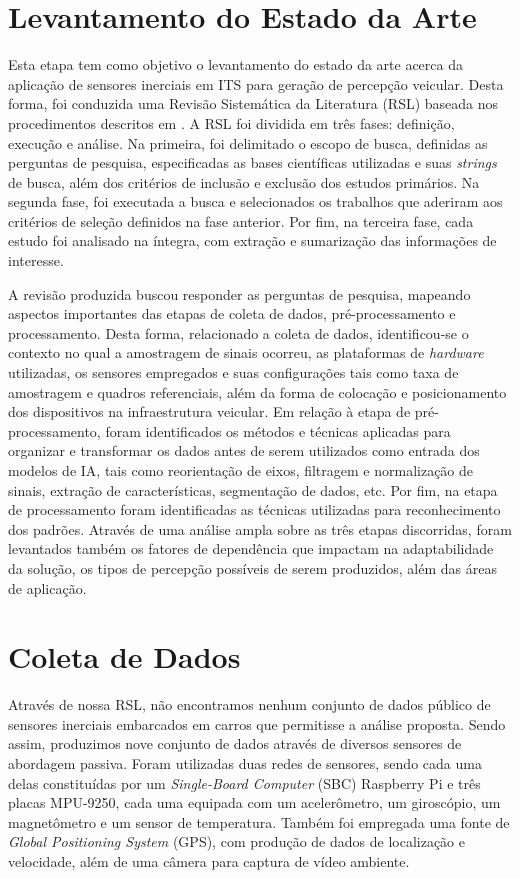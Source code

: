 \section{Levantamento do Estado da Arte}

Esta etapa tem como objetivo o levantamento do estado da arte acerca da aplicação de sensores inerciais em ITS para geração de percepção veicular. Desta forma, foi conduzida uma Revisão Sistemática da Literatura (RSL) baseada nos procedimentos descritos em \cite{kitchenham2004,kitchenham2009,biolchini2005}. A RSL foi dividida em três fases: definição, execução e análise. Na primeira, foi delimitado o escopo de busca, definidas as perguntas de pesquisa, especificadas as bases científicas utilizadas e suas \textit{strings} de busca, além dos critérios de inclusão e exclusão dos estudos primários. Na segunda fase, foi executada a busca e selecionados os trabalhos que aderiram aos critérios de seleção definidos na fase anterior. Por fim, na terceira fase, cada estudo foi analisado na íntegra, com extração e sumarização das informações de interesse.

A revisão produzida buscou responder as perguntas de pesquisa, mapeando aspectos importantes das etapas de coleta de dados, pré-processamento e processamento. Desta forma, relacionado a coleta de dados, identificou-se o contexto no qual a amostragem de sinais ocorreu, as plataformas de \textit{hardware} utilizadas, os sensores empregados e suas configurações tais como taxa de amostragem e quadros referenciais, além da forma de colocação e posicionamento dos dispositivos na infraestrutura veicular. Em relação à etapa de pré-processamento, foram identificados os métodos e técnicas aplicadas para organizar e transformar os dados antes de serem utilizados como entrada dos modelos de IA, tais como reorientação de eixos, filtragem e normalização de sinais, extração de características, segmentação de dados, etc. Por fim, na etapa de processamento foram identificadas as técnicas utilizadas para reconhecimento dos padrões. Através de uma análise ampla sobre as três etapas discorridas, foram levantados também os fatores de dependência que impactam na adaptabilidade da solução, os tipos de percepção possíveis de serem produzidos, além das áreas de aplicação.

\section{Coleta de Dados}

Através de nossa RSL, não encontramos nenhum conjunto de dados público de sensores inerciais embarcados em carros que permitisse a análise proposta. Sendo assim, produzimos nove conjunto de dados através de diversos sensores de abordagem passiva. Foram utilizadas duas redes de sensores, sendo cada uma delas constituídas por um \textit{Single-Board Computer} (SBC) Raspberry Pi e três placas MPU-9250, cada uma equipada com um acelerômetro, um giroscópio, um magnetômetro e um sensor de temperatura. Também foi empregada uma fonte de \textit{Global Positioning System} (GPS), com produção de dados de localização e velocidade, além de uma câmera para captura de vídeo ambiente.

